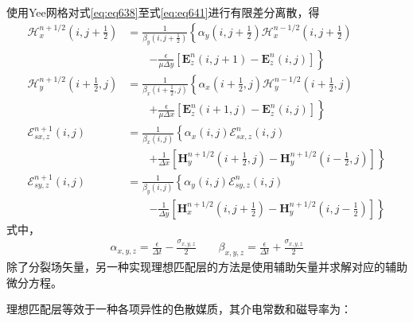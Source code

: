 \documentclass{article}
\numberwithin{equation}{section}
\begin{document}
使用Yee网格对式\ref{eq:eq638}至式\ref{eq:eq641}进行有限差分离散，得
\begin{align}
    \label{eq:eq642}
    \mathcal{H}_x^{n+1/2}\left(i,j+\frac{1}{2}\right)&=\frac{1}{\beta_y\left(i,j+\frac{1}{2}\right)}\left\{\alpha_y\left(i,j+\frac{1}{2}\right)\mathcal{H}_x^{n-1/2}\left(i,j+\frac{1}{2}\right)\right. \nonumber \\
                                                     &\qquad\left.-\frac{\epsilon}{\mu\Delta y}\left[\mathbf{E}_z^n\left(i,j+1\right)-\mathbf{E}_z^n\left(i,j\right)\right]\right\} \\
    \label{eq:eq643}
    \mathcal{H}_y^{n+1/2}\left(i+\frac{1}{2},j\right)&=\frac{1}{\beta_x\left(i+\frac{1}{2},j\right)}\left\{\alpha_x\left(i+\frac{1}{2},j\right)\mathcal{H}_y^{n-1/2}\left(i+\frac{1}{2},j\right)\right. \nonumber \\
                                                     &\qquad\left.+\frac{\epsilon}{\mu\Delta x}\left[\mathbf{E}_z^n\left(i+1,j\right)-\mathbf{E}_z^n\left(i,j\right)\right]\right\} \\
    \label{eq:eq644}
    \mathcal{E}_{sx,z}^{n+1}\left(i,j\right)&=\frac{1}{\beta_x\left(i,j\right)}\left\{\alpha_x\left(i,j\right)\mathcal{E}_{sx,z}^{n}\left(i,j\right)\right. \nonumber \\
                                            &\qquad\left.+\frac{1}{\Delta x}\left[\mathbf{H}_y^{n+1/2}\left(i+\frac{1}{2},j\right)-\mathbf{H}_y^{n+1/2}\left(i-\frac{1}{2},j\right)\right]\right\} \\
    \label{eq:eq645}
    \mathcal{E}_{sy,z}^{n+1}\left(i,j\right)&=\frac{1}{\beta_y\left(i,j\right)}\left\{\alpha_y\left(i,j\right)\mathcal{E}_{sy,z}^{n}\left(i,j\right)\right. \nonumber \\
                                            &\qquad\left.-\frac{1}{\Delta y}\left[\mathbf{H}_x^{n+1/2}\left(i,j+\frac{1}{2}\right)-\mathbf{H}_y^{n+1/2}\left(i,j-\frac{1}{2}\right)\right]\right\}
\end{align}
式中，
\begin{align}
    \label{eq:eq646}
    \alpha_{x,y,z}=\frac{\epsilon}{\Delta t}-\frac{\sigma_{x,y,z}}{2}\qquad\beta_{x,y,z}=\frac{\epsilon}{\Delta t}+\frac{\sigma_{x,y,z}}{2}
\end{align}
除了分裂场矢量，另一种实现理想匹配层的方法是使用辅助矢量并求解对应的辅助微分方程。\par
理想匹配层等效于一种各项异性的色散媒质，其介电常数和磁导率为：
\end{document}
